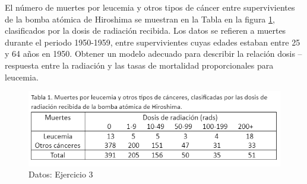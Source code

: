 \documentclass[10.5pt,notitlepage]{article}
\theoremstyle{plain}
\begin{document}
\begin{exo}\label{Ej.3}
El número de muertes por leucemia y otros tipos de cáncer entre supervivientes de la bomba atómica de Hiroshima se muestran en la Tabla en la figura \ref{fig:my_label}, clasificados por la dosis de radiación recibida. Los datos se refieren a muertes durante el periodo 1950-1959, entre supervivientes cuyas edades estaban entre 25 y 64 años en 1950. Obtener un modelo adecuado para describir la relación dosis –respuesta entre la radiación y las tasas de mortalidad proporcionales para leucemia. 
\end{exo} 
\begin{figure}[htb]
    \centering
    \includegraphics[scale = 0.8]{Im1.png}
    \caption{Datos: Ejercicio 3}
    \label{fig:my_label}
\end{figure}
\end{document}
